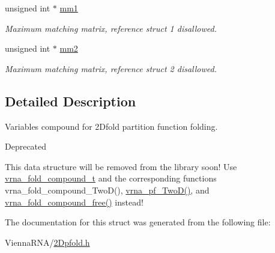 \begin{DoxyCompactItemize}
\mbox{\label{structTwoDpfold__vars_a7c9e9af6224d4696118e05835441863d}} 
unsigned int $\ast$ \mbox{\hyperlink{structTwoDpfold__vars_a7c9e9af6224d4696118e05835441863d}{mm1}}
\begin{DoxyCompactList}\small\item\em Maximum matching matrix, reference struct 1 disallowed. \end{DoxyCompactList}\item 
\mbox{\label{structTwoDpfold__vars_affb913470783f9edb12a0bfc22466269}} 
unsigned int $\ast$ \mbox{\hyperlink{structTwoDpfold__vars_affb913470783f9edb12a0bfc22466269}{mm2}}
\begin{DoxyCompactList}\small\item\em Maximum matching matrix, reference struct 2 disallowed. \end{DoxyCompactList}\end{DoxyCompactItemize}


\subsection{Detailed Description}
Variables compound for 2\+Dfold partition function folding. 

\begin{DoxyRefDesc}{Deprecated}
\item[\mbox{\hyperlink{deprecated__deprecated000006}{Deprecated}}]This data structure will be removed from the library soon! Use \mbox{\hyperlink{group__fold__compound_ga1b0cef17fd40466cef5968eaeeff6166}{vrna\+\_\+fold\+\_\+compound\+\_\+t}} and the corresponding functions vrna\+\_\+fold\+\_\+compound\+\_\+\+Two\+D(), \mbox{\hyperlink{group__kl__neighborhood__pf_ga0bc3427689bd09da09b8b3094a27f836}{vrna\+\_\+pf\+\_\+\+Two\+D()}}, and \mbox{\hyperlink{group__fold__compound_gadded6039d63f5d6509836e20321534ad}{vrna\+\_\+fold\+\_\+compound\+\_\+free()}} instead! \end{DoxyRefDesc}


The documentation for this struct was generated from the following file\+:\begin{DoxyCompactItemize}
\item 
Vienna\+R\+N\+A/\mbox{\hyperlink{2Dpfold_8h}{2\+Dpfold.\+h}}\end{DoxyCompactItemize}
